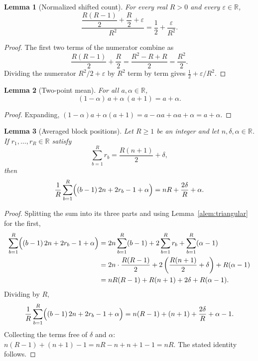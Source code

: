 \documentclass[11pt]{article}
\newtheorem{alemma}{Lemma}[section] %
\begin{document}
\begin{alemma}[Normalized shifted count]\label{alem:normalized}
For every real $R>0$ and every $\varepsilon\in\mathbb{R}$,
\begin{equation}
  \frac{\dfrac{R(R-1)}{2}+\dfrac R2+\varepsilon}{R^2}
  =\frac12+\frac{\varepsilon}{R^2}.
\end{equation}
\end{alemma}

\begin{proof}
The first two terms of the numerator combine as
\begin{equation}
  \frac{R(R-1)}{2}+\frac R2=\frac{R^2-R+R}{2}=\frac{R^2}{2}.
\end{equation}
Dividing the numerator $R^2/2+\varepsilon$ by $R^2$ term by term gives $\tfrac12+\varepsilon/R^2$.
\end{proof}

\begin{alemma}[Two-point mean]\label{alem:twopoint}
For all $a,\alpha\in\mathbb{R}$,
\begin{equation}
  (1-\alpha)\,a+\alpha\,(a+1)=a+\alpha.
\end{equation}
\end{alemma}

\begin{proof}
Expanding, $(1-\alpha)a+\alpha(a+1)=a-\alpha a+\alpha a+\alpha=a+\alpha$.
\end{proof}

\begin{alemma}[Averaged block positions]\label{alem:blockavg}
Let $R\ge 1$ be an integer and let $n,\delta,\alpha\in\mathbb{R}$.  If $r_1,\ldots,r_R\in\mathbb{R}$ satisfy
\begin{equation}
  \sum_{b=1}^R r_b=\frac{R(n+1)}{2}+\delta,
\end{equation}
then
\begin{equation}
  \frac1R\sum_{b=1}^R\Bigl((b-1)\,2n+2r_b-1+\alpha\Bigr)
  =nR+\frac{2\delta}{R}+\alpha.
\end{equation}
\end{alemma}

\begin{proof}
Splitting the sum into its three parts and using Lemma~\ref{alem:triangular} for the first,
\begin{align}
  \sum_{b=1}^R\Bigl((b-1)\,2n+2r_b-1+\alpha\Bigr)
  &=2n\sum_{b=1}^R(b-1)+2\sum_{b=1}^R r_b+\sum_{b=1}^R(\alpha-1)\notag\\
  &=2n\cdot\frac{R(R-1)}{2}+2\left(\frac{R(n+1)}{2}+\delta\right)+R(\alpha-1)\notag\\
  &=nR(R-1)+R(n+1)+2\delta+R(\alpha-1).
\end{align}
Dividing by $R$,
\begin{equation}
  \frac1R\sum_{b=1}^R\Bigl((b-1)\,2n+2r_b-1+\alpha\Bigr)
  =n(R-1)+(n+1)+\frac{2\delta}{R}+\alpha-1.
\end{equation}
Collecting the terms free of $\delta$ and $\alpha$: $n(R-1)+(n+1)-1=nR-n+n+1-1=nR$.  The stated identity follows.
\end{proof}
\end{document}
